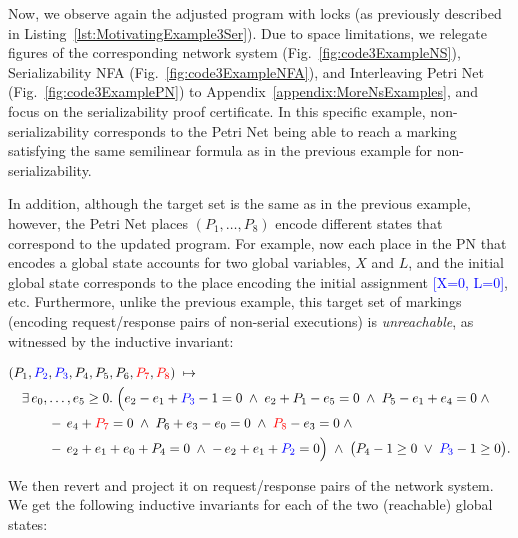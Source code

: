 Now, we observe again the adjusted program with locks (as previously described in Listing~\ref{lst:MotivatingExample3Ser}).
%
Due to space limitations, we relegate figures of the corresponding network system (Fig.~\ref{fig:code3ExampleNS}), Serializability NFA (Fig.~\ref{fig:code3ExampleNFA}), and Interleaving Petri Net (Fig.~\ref{fig:code3ExamplePN}) to Appendix~\ref{appendix:MoreNsExamples}, and focus on the serializability proof certificate.
%
In this specific example, non-serializability corresponds to the Petri Net being able to reach a marking satisfying the same semilinear formula as in the previous example for non-serializability.
%


In addition, although the target set is the same as in the previous example, however, the Petri Net places $(P_1,\ldots,P_8)$ encode different states that correspond to the updated program. For example, now each place in the PN that encodes a global state accounts for two global variables, $X$ and $L$, and the initial global state corresponds to the place encoding the initial assignment \textcolor{blue}{[X=0, L=0]}, etc.
%
Furthermore, unlike the previous example, this target set of markings (encoding request/response pairs of non-serial executions) is \textit{unreachable}, as witnessed by the inductive invariant:


\[
\begin{aligned}
	&(P_{1},\textcolor{blue}{P_{2}},\textcolor{blue}{P_{3}},P_{4},P_{5},P_{6},\textcolor{red}{P_{7}},\textcolor{red}{P_{8}})
	\;\mapsto\;\\
	&\quad
	\exists\,e_{0},\dots,e_{5}\ge0.\;
	\Bigl(
	e_{2}-e_{1}+\textcolor{blue}{P_{3}}-1=0\;\land\;
	e_{2}+P_{1}-e_{5}=0\;\land\;
	P_{5}-e_{1}+e_{4}=0\;\land\\
	&\qquad\quad
	-\,e_{4}+\textcolor{red}{P_{7}}=0\;\land\;
	P_{6}+e_{3}-e_{0}=0\;\land\;
	\textcolor{red}{P_{8}}-e_{3}=0\;\land\\
	&\qquad\quad
	-\,e_{2}+e_{1}+e_{0}+P_{4}=0\;\land\;
	-\,e_{2}+e_{1}+\textcolor{blue}{P_{2}}=0
	\Bigr)
	\;\land\;
	\bigl(P_{4}-1\ge0\;\lor\;\textcolor{blue}{P_{3}}-1\ge0\bigr).
\end{aligned}
\]


We then revert and project it on request/response pairs of the network system.
%
We get the following inductive invariants for each of the two (reachable) global states:

